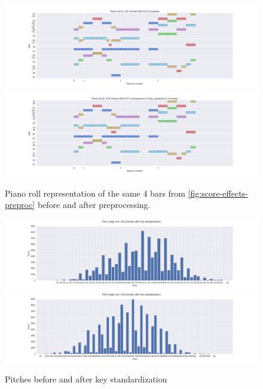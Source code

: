 \begin{figure}[htpb]
    \centering
        \includegraphics[width=1.0\linewidth]{Figures/bwv133-6-original-piano-roll.png}
        \includegraphics[width=1.0\linewidth]{Figures/bwv133-6-preproc-piano-roll.png}
    \caption{Piano roll representation of the same 4 bars from \autoref{fig:score-effects-preproc}
    before and after preprocessing.}
    \label{fig:piano-roll-effects-preproc}
\end{figure}

\begin{figure}[htpb]
    \centering
    \includegraphics[width=1.0\linewidth]{Figures/pitch-usage-original.png}
    \includegraphics[width=1.0\linewidth]{Figures/pitch-usage-preproc.png}
    \caption{Pitches before and after key standardization}
    \label{fig:pitch-key-standardization}
\end{figure}

